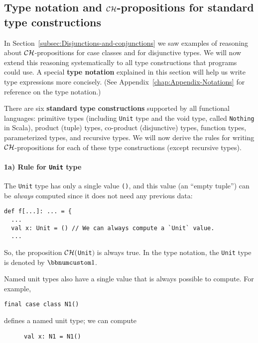\subsection{Type notation and ${\cal CH}$-propositions for standard type constructions\label{subsec:Type-notation-and-standard-type-constructions}}

In Section~\ref{subsec:Disjunctions-and-conjunctions} we saw examples
of reasoning about ${\cal CH}$-propositions for case classes and
for disjunctive types. We will now extend this reasoning systematically
to all type constructions that programs could use. A special \textbf{type
notation} explained in this section will help
us write type expressions more concisely. (See Appendix~\ref{chap:Appendix-Notations}
for reference on the type notation.)

There are six \textbf{standard type constructions}
supported by all functional languages: primitive types (including
\lstinline!Unit! type and the void type, called \lstinline!Nothing!
in Scala), product (tuple) types, co-product (disjunctive) types,
function types, parameterized types, and recursive types. We will
now derive the rules for writing ${\cal CH}$-propositions for each
of these type constructions (except recursive types).

\paragraph{1a) Rule for \lstinline!Unit! type}

The \lstinline!Unit! type has only a single value \lstinline!()!,
and this value (an ``empty tuple'') can be \emph{always} computed
since it does not need any previous data:
\begin{lstlisting}
def f[...]: ... = {
  ...
  val x: Unit = () // We can always compute a `Unit` value.
  ...
\end{lstlisting}
So, the proposition ${\cal CH}($\lstinline!Unit!$)$ is always true.
In the type notation, the \lstinline!Unit! type is denoted by $\bbnum 1$.

Named unit types also have a single value
that is always possible to compute. For example,
\begin{lstlisting}
final case class N1()
\end{lstlisting}
defines a named unit type; we can compute

\begin{wrapfigure}{l}{0.44\columnwidth}%
\vspace{-0.7\baselineskip}
\begin{lstlisting}
val x: N1 = N1()
\end{lstlisting}

\vspace{-0.9\baselineskip}
\end{wrapfigure}%

